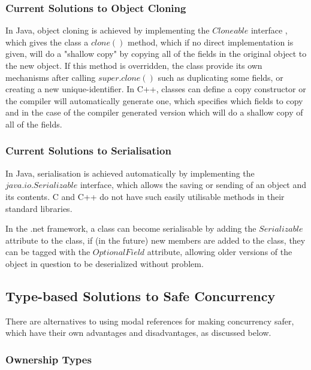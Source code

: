 \documentclass{article}
\begin{document}
\subsubsection{Current Solutions to Object Cloning}

In Java, object cloning is achieved by implementing the $Cloneable$ interface \cite{java-cloneable}, which gives the class a $clone()$ method, which if no direct implementation is given, will do a "shallow copy" by copying all of the fields in the original object to the new object.
If this method is overridden, the class provide its own mechanisms after calling $super.clone()$ such as duplicating some fields, or creating a new unique-identifier.
In C++, classes can define a copy constructor or the compiler will automatically generate one\cite{ansi:03:c++}, which specifies which fields to copy and in the case of the compiler generated version which will do a shallow copy of all of the fields. 

\subsubsection{Current Solutions to Serialisation}

In Java, serialisation is achieved automatically by implementing the $java.io.Serializable$ \cite{java-serializable} interface, which allows the saving or sending of an object and its contents.
C and C++ do not have such easily utilisable methods in their standard libraries.

In the .net framework, a class can become serialisable by adding the $Serializable$\cite{net-serializable} attribute to the class, if (in the future) new members are added to the class, they can be tagged with the $OptionalField$ attribute\cite{net-optional}, allowing older versions of the object in question to be deserialized without problem.

\subsection{Type-based Solutions to Safe Concurrency}

There are alternatives to using modal references for making concurrency safer, which have their own advantages and disadvantages, as discussed below.

\subsubsection{Ownership Types}
\end{document}
